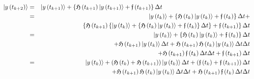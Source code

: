 \begin{eqnarray}
\left| y\left( t_{k+2}\right) \right\rangle &=&\left| y\left( t_{k+1}\right)
\right\rangle +\left\{ {\frak H}\left( t_{k+1}\right) \left| y\left(
t_{k+1}\right) \right\rangle +{\frak f}\left( t_{k+1}\right) \right\} \Delta
t\qquad \qquad \qquad \qquad \qquad \qquad \qquad \,  \nonumber \\
&=&\left| y\left( t_{k}\right) \right\rangle +\left\{ {\frak H}\left(
t_{k}\right) \left| y\left( t_{k}\right) \right\rangle +{\frak f}\left(
t_{k}\right) \right\} \Delta t+  \nonumber \\
&&\left\{ {\frak H}\left( t_{k+1}\right) \left\{ \left| y\left( t_{k}\right)
\right\rangle +\left\{ {\frak H}\left( t_{k}\right) \left| y\left(
t_{k}\right) \right\rangle +{\frak f}\left( t_{k}\right) \right\} \Delta
t\right\} +{\frak f}\left( t_{k+1}\right) \right\} \Delta t  \nonumber \\
&=&\left| y\left( t_{k}\right) \right\rangle +\left\{ {\frak H}\left(
t_{k}\right) \left| y\left( t_{k}\right) \right\rangle +{\frak f}\left(
t_{k}\right) \right\} \Delta t  \nonumber \\
&&+{\frak H}\left( t_{k+1}\right) \left| y\left( t_{k}\right) \right\rangle
\Delta t+{\frak H}\left( t_{k+1}\right) {\frak H}\left( t_{k}\right) \left|
y\left( t_{k}\right) \right\rangle \Delta t\Delta t  \nonumber \\
&&\qquad \qquad \qquad \qquad \qquad \qquad +{\frak H}\left( t_{k+1}\right) 
{\frak f}\left( t_{k}\right) \Delta t\Delta t+{\frak f}\left( t_{k+1}\right)
\Delta t  \nonumber \\
&=&\left| y\left( t_{k}\right) \right\rangle +\left( {\frak H}\left(
t_{k}\right) +{\frak H}\left( t_{k+1}\right) \right) \left| y\left(
t_{k}\right) \right\rangle \Delta t+\left( {\frak f}\left( t_{k}\right) +%
{\frak f}\left( t_{k+1}\right) \right) \Delta t  \nonumber \\
&&+{\frak H}\left( t_{k+1}\right) {\frak H}\left( t_{k}\right) \left|
y\left( t_{k}\right) \right\rangle \Delta t\Delta t+{\frak H}\left(
t_{k+1}\right) {\frak f}\left( t_{k}\right) \Delta t\Delta t
\end{eqnarray}%
